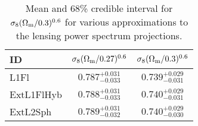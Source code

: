 \renewcommand{\baselinestretch}{1.5}
\begin{table}

  \label{tab:CFHTLenS_Sigma8}

  \caption{Mean and 68\% credible interval for 
  $\sigma_8 (\Omega_{\rm m}/0.3)^{0.6}$ for various approximations to the lensing
  power spectrum projections.}

  \begin{tabular}{lcc} \hline
  ID         & $\sigma_8 (\Omega_{\rm m}/0.27)^{0.6}$ & $\sigma_8 (\Omega_{\rm m}/0.3)^{0.6}$\\ \hline
  L1Fl       & $0.787^{+0.031}_{-0.033}$ & $0.739^{+0.029}_{-0.031}$ \\
  ExtL1FlHyb & $0.788^{+0.031}_{-0.033}$ & $0.740^{+0.029}_{-0.031}$ \\
  ExtL2Sph   & $0.789^{+0.031}_{-0.032}$ & $0.740^{+0.029}_{-0.030}$ \\ \hline
  \end{tabular}

\end{table}
\renewcommand{\baselinestretch}{1}


